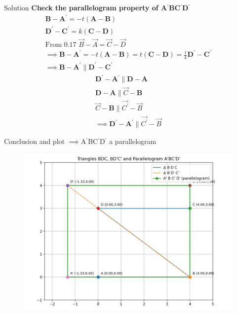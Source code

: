 \documentclass{beamer}
\numberwithin{equation}{section}
\theoremstyle{remark}
\let\vec\mathbf
\begin{document}
\begin{frame}{Solution}
\textbf{Check the parallelogram property of A$^{\prime}$BC$^{\prime}$D$^{\prime}$ }\\
\begin{align}
    \vec{B}-\vec{A^{\prime}}=-t(\vec{A}-\vec{B})\\
    \vec{D^{\prime}}-\vec{C^{\prime}}=k(\vec{C}-\vec{D})\\
    \text{From 0.17 }\Vec{B}-\Vec{A}=\Vec{C}-\Vec{D}\\
\implies \vec{B}-\vec{A^{\prime}}=-t(\vec{A}-\vec{B})=t(\vec{C}-\vec{D})=\frac{t}{k}\vec{D^{\prime}}-\vec{C^{\prime}}\\
\implies \vec{B}-\vec{A^{\prime}} \parallel \vec{D^{\prime}}-\vec{C^{\prime}}
\end{align}
    \begin{align}
    \vec{D^{\prime}}-\vec{A^{\prime}} \parallel \vec{D}-\vec{A}\\
    \vec{D}-\vec{A} \parallel \Vec{C}-\vec{B}\\
     \Vec{C}-\vec{B} \parallel \Vec{C^{\prime}}-\Vec{B}\\
\implies \vec{D^{\prime}}-\vec{A^{\prime}} \parallel \Vec{C^{\prime}}-\Vec{B}
\end{align}
\end{frame}

\begin{frame}{Conclusion and plot}
$\implies$A$^{\prime}$BC$^{\prime}$D$^{\prime}$ a parallelogram
\begin{figure}[H]
    \centering
    \includegraphics[width=1.0\columnwidth]{figs/01.png}
    \label{fig-1}
\end{figure}
\end{frame}
\end{document}
